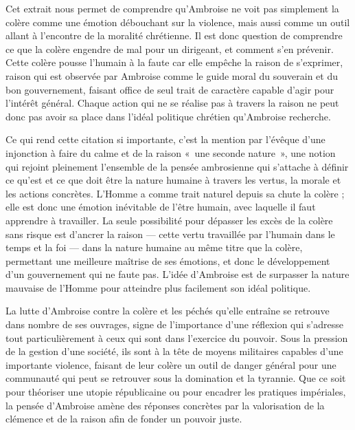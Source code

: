 \bigskip

Cet extrait nous permet de comprendre qu'Ambroise ne voit pas simplement la colère comme une émotion débouchant sur la violence, mais aussi comme un outil allant à l'encontre de la moralité chrétienne. Il est donc question de comprendre ce que la colère engendre de mal pour un dirigeant, et comment s'en prévenir. Cette colère pousse l'humain à la faute car elle empêche la raison de s'exprimer, raison qui est observée par Ambroise comme le guide moral du souverain et du bon gouvernement, faisant office de seul trait de caractère capable d'agir pour l'intérêt général. Chaque action qui ne se réalise pas à travers la raison ne peut donc pas avoir sa place dans l'idéal politique chrétien qu'Ambroise recherche.

\bigskip

Ce qui rend cette citation si importante, c'est la mention par l'évêque d'une injonction à faire du calme et de la raison «~une seconde nature~», une notion qui rejoint pleinement l'ensemble de la pensée ambrosienne qui s'attache à définir ce qu'est et ce que doit être la nature humaine à travers les vertus, la morale et les actions concrètes. L'Homme a comme trait naturel depuis sa chute la colère ; elle est donc une émotion inévitable de l'être humain, avec laquelle il faut apprendre à travailler. La seule possibilité pour dépasser les excès de la colère sans risque est d'ancrer la raison — cette vertu travaillée par l'humain dans le temps et la foi — dans la nature humaine au même titre que la colère, permettant une meilleure maîtrise de ses émotions, et donc le développement d'un gouvernement qui ne faute pas. L'idée d'Ambroise est de surpasser la nature mauvaise de l'Homme pour atteindre plus facilement son idéal politique.

\bigskip

La lutte d'Ambroise contre la colère et les péchés qu'elle entraîne se retrouve dans nombre de ses ouvrages, signe de l'importance d'une réflexion qui s'adresse tout particulièrement à ceux qui sont dans l'exercice du pouvoir. Sous la pression de la gestion d'une société, ils sont à la tête de moyens militaires capables d'une importante violence, faisant de leur colère un outil de danger général pour une communauté qui peut se retrouver sous la domination et la tyrannie. Que ce soit pour théoriser une utopie républicaine ou pour encadrer les pratiques impériales, la pensée d'Ambroise amène des réponses concrètes par la valorisation de la clémence et de la raison afin de fonder un pouvoir juste.

